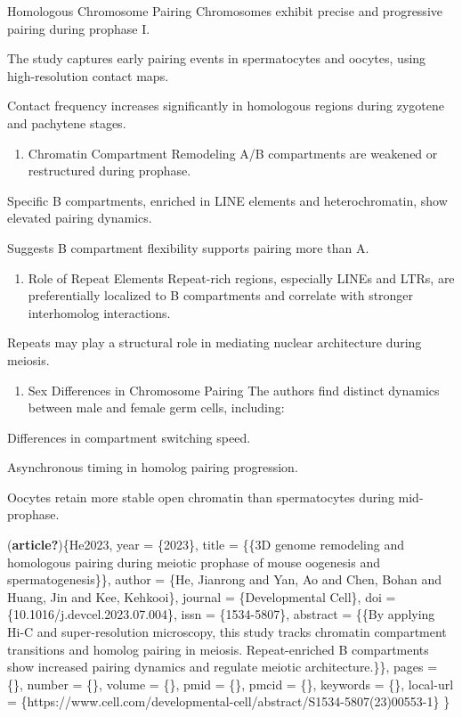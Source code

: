 \documentclass[
  a4paper,
]{scrbook}
\providecommand{\tightlist}{%
  \setlength{\itemsep}{0pt}\setlength{\parskip}{0pt}}
\begin{document}
Homologous Chromosome Pairing Chromosomes exhibit precise and
progressive pairing during prophase I.

The study captures early pairing events in spermatocytes and oocytes,
using high-resolution contact maps.

Contact frequency increases significantly in homologous regions during
zygotene and pachytene stages.

\begin{enumerate}
\def\labelenumi{\arabic{enumi}.}
\setcounter{enumi}{1}
\tightlist
\item
  Chromatin Compartment Remodeling A/B compartments are weakened or
  restructured during prophase.
\end{enumerate}

Specific B compartments, enriched in LINE elements and heterochromatin,
show elevated pairing dynamics.

Suggests B compartment flexibility supports pairing more than A.

\begin{enumerate}
\def\labelenumi{\arabic{enumi}.}
\setcounter{enumi}{2}
\tightlist
\item
  Role of Repeat Elements Repeat-rich regions, especially LINEs and
  LTRs, are preferentially localized to B compartments and correlate
  with stronger interhomolog interactions.
\end{enumerate}

Repeats may play a structural role in mediating nuclear architecture
during meiosis.

\begin{enumerate}
\def\labelenumi{\arabic{enumi}.}
\setcounter{enumi}{3}
\tightlist
\item
  Sex Differences in Chromosome Pairing The authors find distinct
  dynamics between male and female germ cells, including:
\end{enumerate}

Differences in compartment switching speed.

Asynchronous timing in homolog pairing progression.

Oocytes retain more stable open chromatin than spermatocytes during
mid-prophase.

(\textbf{article?})\{He2023, year = \{2023\}, title = \{\{3D genome
remodeling and homologous pairing during meiotic prophase of mouse
oogenesis and spermatogenesis\}\}, author = \{He, Jianrong and Yan, Ao
and Chen, Bohan and Huang, Jin and Kee, Kehkooi\}, journal =
\{Developmental Cell\}, doi = \{10.1016/j.devcel.2023.07.004\}, issn =
\{1534-5807\}, abstract = \{\{By applying Hi-C and super-resolution
microscopy, this study tracks chromatin compartment transitions and
homolog pairing in meiosis. Repeat-enriched B compartments show
increased pairing dynamics and regulate meiotic architecture.\}\}, pages
= \{\}, number = \{\}, volume = \{\}, pmid = \{\}, pmcid = \{\},
keywords = \{\}, local-url =
\{https://www.cell.com/developmental-cell/abstract/S1534-5807(23)00553-1\}
\}
\end{document}
